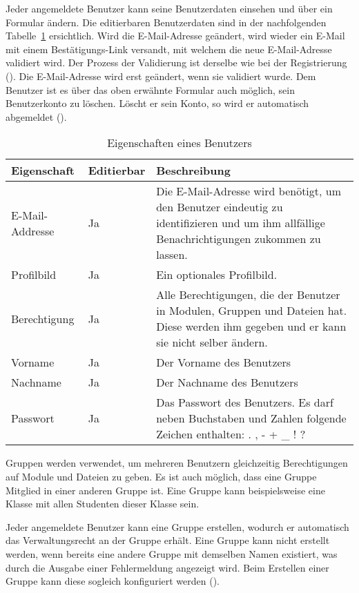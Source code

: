 Jeder angemeldete Benutzer kann seine Benutzerdaten einsehen und über ein Formular ändern. Die editierbaren Benutzerdaten sind in der nachfolgenden Tabelle~\ref{tab:benutzer_eigenschaften} ersichtlich. Wird die E-Mail-Adresse geändert, wird wieder ein E-Mail mit einem Bestätigungs-Link versandt, mit welchem die neue E-Mail-Adresse validiert wird. Der Prozess der Validierung ist derselbe wie bei der Registrierung (). Die E-Mail-Adresse wird erst geändert, wenn sie validiert wurde. 
Dem Benutzer ist es über das oben erwähnte Formular auch möglich, sein Benutzerkonto zu löschen. Löscht er sein Konto, so wird er automatisch abgemeldet ().

\begin{table}[H]
\begin{tabularx}{\textwidth}{|l|l|X|} \hline
\textbf{Eigenschaft} &\textbf{Editierbar} & \textbf{Beschreibung} \\ \hline
E-Mail-Addresse		& Ja 	& Die E-Mail-Adresse wird benötigt, um den Benutzer eindeutig zu identifizieren und um ihm allfällige Benachrichtigungen zukommen zu lassen.\\ \hline
Profilbild			& Ja 	& Ein optionales Profilbild.\\ \hline
Berechtigung 		& Ja 	& Alle Berechtigungen, die der Benutzer in Modulen, Gruppen und Dateien hat. Diese werden ihm gegeben und er kann sie nicht selber ändern.\\ \hline
Vorname 			& Ja 	& Der Vorname des Benutzers\\ \hline
Nachname			& Ja	& Der Nachname des Benutzers\\ \hline
Passwort			& Ja	& Das Passwort des Benutzers. Es darf neben Buchstaben und Zahlen folgende Zeichen enthalten: . , - + _ ! ? \\ \hline
\end{tabularx}
\caption{Eigenschaften eines Benutzers}
\label{tab:benutzer_eigenschaften}
\end{table}

Gruppen werden verwendet, um mehreren Benutzern gleichzeitig Berechtigungen auf Module und Dateien zu geben. Es ist auch möglich, dass eine Gruppe Mitglied in einer anderen Gruppe ist. Eine Gruppe kann beispielsweise eine Klasse mit allen Studenten dieser Klasse sein.

Jeder angemeldete Benutzer kann eine Gruppe erstellen, wodurch er automatisch das Verwaltungsrecht an der Gruppe erhält. Eine Gruppe kann nicht erstellt werden, wenn bereits eine andere Gruppe mit demselben Namen existiert, was durch die Ausgabe einer Fehlermeldung angezeigt wird.
Beim Erstellen einer Gruppe kann diese sogleich konfiguriert werden ().

